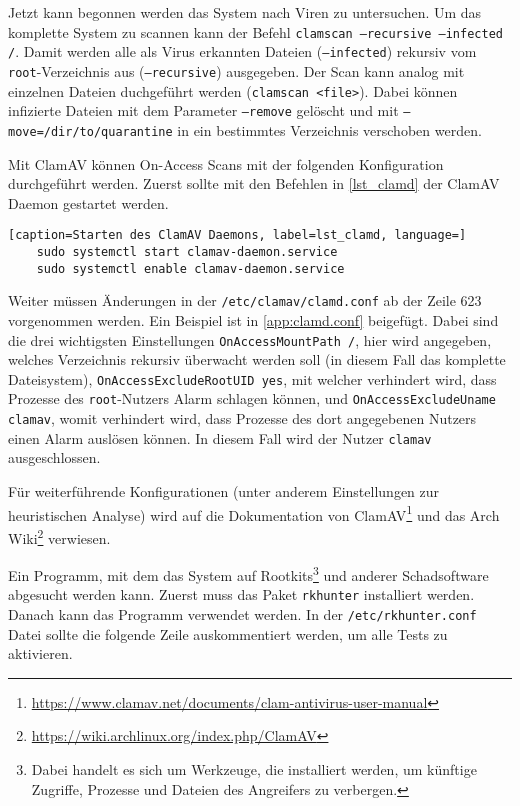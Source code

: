 Jetzt kann begonnen werden das System nach Viren zu untersuchen. Um das komplette System zu scannen kann der Befehl \texttt{clamscan --recursive --infected /}. Damit werden alle als Virus erkannten Dateien {\small(\texttt{--infected})} rekursiv vom \texttt{root}-Verzeichnis aus {\small(\texttt{--recursive})} ausgegeben. Der Scan kann analog mit einzelnen Dateien duchgeführt werden {\small(\texttt{clamscan <file>})}. Dabei können infizierte Dateien mit dem Parameter \texttt{--remove} gelöscht und mit \texttt{--move=/dir/to/quarantine} in ein bestimmtes Verzeichnis verschoben werden. 

Mit ClamAV können On-Access Scans mit der folgenden Konfiguration durchgeführt werden. Zuerst sollte mit den Befehlen in \autoref{lst_clamd} der ClamAV Daemon gestartet werden.\cite{ClamAVArchWiki}

\begin{lstlisting}[caption=Starten des ClamAV Daemons, label=lst_clamd, language=]
	sudo systemctl start clamav-daemon.service
	sudo systemctl enable clamav-daemon.service
\end{lstlisting}

Weiter müssen Änderungen in der \texttt{/etc/clamav/clamd.conf} ab der Zeile 623 vorgenommen werden. Ein Beispiel ist in \autoref{app:clamd.conf} beigefügt. Dabei sind die drei wichtigsten Einstellungen \texttt{OnAccessMountPath /}, hier wird angegeben, welches Verzeichnis rekursiv überwacht werden soll {\small(in diesem Fall das komplette Dateisystem)}, \texttt{OnAccessExcludeRootUID yes}, mit welcher verhindert wird, dass Prozesse des \texttt{root}-Nutzers Alarm schlagen können, und \texttt{OnAccessExcludeUname clamav}, womit verhindert wird, dass Prozesse des dort angegebenen Nutzers einen Alarm auslösen können. In diesem Fall wird der Nutzer \texttt{clamav} ausgeschlossen.\cite{ClamAVArchWiki,OnAccessScanningClamAV}

Für weiterführende Konfigurationen {\small(unter anderem Einstellungen zur heuristischen Analyse)} wird auf die Dokumentation von ClamAV\footnote{\url{https://www.clamav.net/documents/clam-antivirus-user-manual}} und das Arch Wiki\footnote{\url{https://wiki.archlinux.org/index.php/ClamAV}} verwiesen.

Ein Programm, mit dem das System auf Rootkits\footnote{Dabei handelt es sich um Werkzeuge, die installiert werden, um künftige Zugriffe, Prozesse und Dateien des Angreifers zu verbergen.\cite{Rootkit2020}} und anderer Schadsoftware abgesucht werden kann. Zuerst muss das Paket \texttt{rkhunter} installiert werden. Danach kann das Programm verwendet werden. In der \texttt{/etc/rkhunter.conf} Datei sollte die folgende Zeile auskommentiert werden, um alle Tests zu aktivieren.

